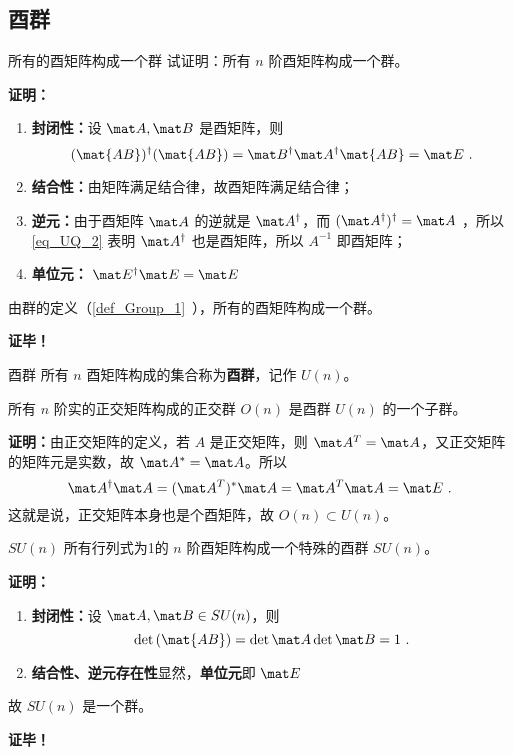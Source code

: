 \subsection{酉群}
\begin{example}{所有的酉矩阵构成一个群}
试证明：所有 $n$ 阶酉矩阵构成一个群。

\textbf{证明：}
\begin{enumerate}
\item \textbf{封闭性：}设 $\mat A,\mat B$ 是酉矩阵，则
\begin{equation}
(\mat{AB})^\dagger(\mat{AB})=\mat B^\dagger \mat A^\dagger\mat{AB}=\mat E~.
\end{equation}
\item \textbf{结合性：}由矩阵满足结合律，故酉矩阵满足结合律；
\item \textbf{逆元：}由于酉矩阵 $\mat A$ 的逆就是 $\mat A^\dagger$，而 $(\mat A^\dagger)^\dagger=\mat A$ ，所以\autoref{eq_UQ_2} 表明 $\mat A^\dagger$ 也是酉矩阵，所以 $A^{-1}$ 即酉矩阵；
\item \textbf{单位元：} $\mat E^\dagger\mat E=\mat E$
\end{enumerate}
由群的定义（\autoref{def_Group_1}~），所有的酉矩阵构成一个群。

\textbf{证毕！}
\end{example}
\begin{definition}{酉群}
所有 $n$ 酉矩阵构成的集合称为\textbf{酉群}，记作 $U(n)$。
\end{definition}
\begin{theorem}{}
所有 $n$ 阶实的正交矩阵构成的正交群 $O(n)$ 是酉群 $U(n)$ 的一个子群。
\end{theorem}
\textbf{证明：}由正交矩阵的定义，若 $A$ 是正交矩阵，则 $\mat A^T=\mat A$，又正交矩阵的矩阵元是实数，故 $\mat A^*=\mat A$。所以
\begin{equation}
\mat A^\dagger\mat A=(\mat A^T)^*\mat A=\mat A^T\mat A=\mat E~.
\end{equation}
这就是说，正交矩阵本身也是个酉矩阵，故 $O(n)\subset U(n)$。
\begin{theorem}{$SU(n)$}
所有行列式为1的 $n$ 阶酉矩阵构成一个特殊的酉群 $SU(n)$。
\end{theorem}
\textbf{证明：}
\begin{enumerate}
\item \textbf{封闭性：}设 $\mat A,\mat B\in SU(n)$，则
\begin{equation}
\det{(\mat{AB})}=\det{\mat A}\det{\mat B}=1~.
\end{equation}
\item \textbf{结合性、逆元存在性}显然，\textbf{单位元}即 $\mat E$
\end{enumerate}
故 $SU(n)$ 是一个群。

\textbf{证毕！}
